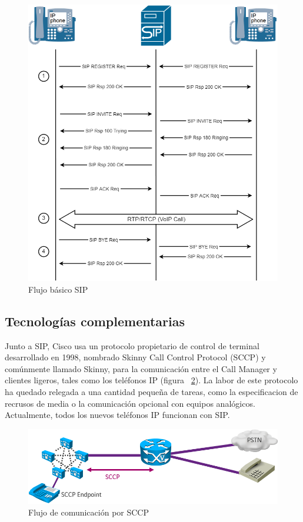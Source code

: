 \documentclass[a4paper, 12pt]{book}
\begin{document}
\begin{figure}[h]
  \centering
  \includegraphics{img/fig_sip_flow}
  \caption{Flujo básico SIP}
  \label{figura:fig_sip_flow}
\end{figure}

\subsection{Tecnologías complementarias}
\label{sec:tecnologias-complementarias}
Junto a SIP, Cisco usa un protocolo propietario de control de terminal desarrollado en 1998, nombrado Skinny Call Control Protocol (SCCP) y comúnmente llamado Skinny, para la comunicación entre el Call Manager y clientes ligeros, tales como los teléfonos IP (figura ~\ref{figura:fig_skinny}). La labor de este protocolo ha quedado relegada a una cantidad pequeña de tareas, como la especificacion de recrusos de media o la comunicación opcional con equipos analógicos. Actualmente, todos los nuevos teléfonos IP funcionan con SIP.

\begin{figure}[h!]
  \centering
  \includegraphics{img/fig_skinny}
  \caption{Flujo de comunicación por SCCP}
  \label{figura:fig_skinny}
\end{figure}
\end{document}
